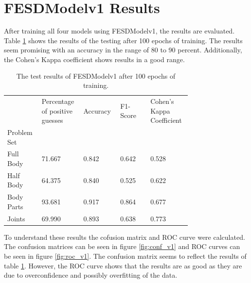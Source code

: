 \section{FESDModelv1 Results}
\label{sec:FESDModelv1_results}

After training all four models using FESDModelv1, the results are evaluated. Table \ref{tab:res_v1} shows the results of the testing after 100 epochs of training. The results seem promising with an accuracy in the range of 80 to 90 percent. Additionally, the Cohen's Kappa coefficient shows results in a good range.

\begin{table}
  \caption[Test Results of FESDModelv1]{The test results of FESDModelv1 after 100 epochs of training.}
  \label{tab:res_v1}
  \centering
  \begin{tabular}{p{0.15\linewidth}p{0.15\linewidth}p{0.15\linewidth}p{0.15\linewidth}p{0.15\linewidth}}
    \hline
    {} &  Percentage of positive guesses &  Accuracy &  F1-Score &  Cohen's Kappa Coefficient \\
    Problem Set   &                                 &           &           &                            \\
    \hline
    Full Body  &                          71.667 &     0.842 &     0.642 &                      0.528 \\
    Half Body  &                          64.375 &     0.840 &     0.525 &                      0.622 \\
    Body Parts &                          93.681 &     0.917 &     0.864 &                      0.677 \\
    Joints     &                          69.990 &     0.893 &     0.638 &                      0.773 \\
    \hline
  \end{tabular}
\end{table}

To understand these results the cofusion matrix and ROC curve were calculated. The confusion matrices can be seen in figure \ref{fig:conf_v1} and ROC curves can be seen in figure \ref{fig:roc_v1}. The confusion matrix seems to reflect the results of table \ref{tab:res_v1}. However, the ROC curve shows that the results are as good as they are due to overconfidence and possibly overfitting of the data.

